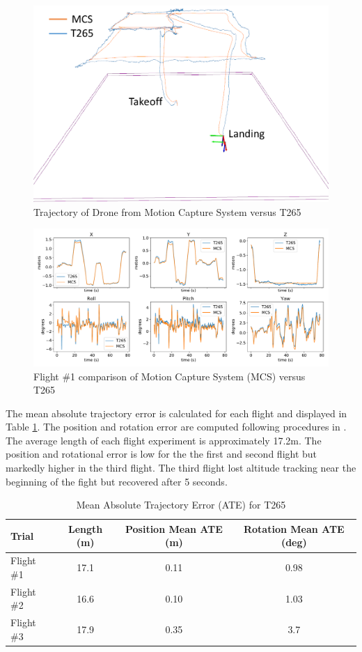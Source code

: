 \begin{figure}[!ht]
    \centering  
    \includegraphics[page=1,clip,trim=0cm 0cm 0cm 0cm,width=.45\linewidth]{chapter_7_experiments/imgs/flight_path_t265_mcs.pdf}
    \caption[Trajectory of drone from Motion Capture System (MCS) versus T265]{Trajectory of Drone from Motion Capture System versus T265}\label{fig:ch7_flight_path_3d}
\end{figure}

\begin{figure}[!ht]
    \centering  
    \includegraphics[page=1,clip,trim=0cm 0cm 0cm 0cm,width=.95\linewidth]{chapter_7_experiments/imgs/t265_gt_graphs_v2.pdf}
    \caption[Comparison of Motion Capture System (MCS) versus T265]{Flight \#1 comparison of Motion Capture System (MCS) versus T265}\label{fig:ch7_t265}
\end{figure}
The mean absolute trajectory error is calculated for each flight and displayed in Table \ref{table:ch7_ate}. The position and rotation error are computed following procedures in \cite{zhang_tutorial_2018}. The average length of each flight experiment is approximately 17.2m. The position and rotational error is low for the the first and second flight but markedly higher in the third flight. The third flight lost altitude tracking near the beginning of the fight but recovered after 5 seconds.

\begin{table}[h]
\centering
\caption{Mean Absolute Trajectory Error (ATE) for T265}\label{table:ch7_ate}
\begin{tabular}{@{}lccc@{}}
\toprule
Trial    & Length (m) & Position Mean ATE (m) & Rotation Mean ATE (deg) \\ \midrule
Flight \#1 & 17.1       & 0.11                  & 0.98                    \\
Flight \#2 & 16.6       & 0.10                  & 1.03                    \\
Flight \#3 & 17.9       & 0.35                  & 3.7                     \\ \bottomrule
\end{tabular}
\end{table}


